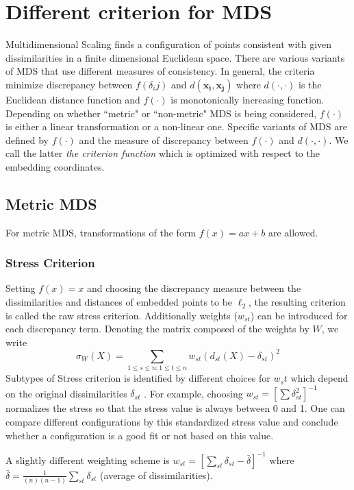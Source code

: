 \documentclass[12pt,oneside,final]{thesis}\usepackage[]{graphicx}\usepackage[]{color}
\begin{document}
\section{Different criterion for MDS \label{sec:MDSvariant}}
Multidimensional Scaling finds a configuration of points consistent with given dissimilarities in a finite dimensional Euclidean space. There are various variants of MDS that use different measures of consistency.  In general, the criteria minimize discrepancy between $f(\delta_ij)$ and  $d(\bm{x_i},\bm{x_j})$ where $d(\cdot,\cdot)$ is the Euclidean distance function and $f(\cdot)$ is monotonically increasing function. Depending on whether ``metric" or ``non-metric" MDS is being considered, $f(\cdot)$ is either a linear transformation or a non-linear one. Specific variants of MDS are defined by $f(\cdot)$ and the measure of discrepancy between  $f(\cdot)$ and $d(\cdot,\cdot)$. We call the latter \emph{the criterion function} which is optimized with respect to the embedding coordinates.


\subsection{Metric MDS}
 For metric MDS, transformations of the form  $f(x)=ax+b$ are allowed.
 \subsubsection{Stress Criterion}
 Setting $f(x)=x$ and choosing  the discrepancy measure between the dissimilarities and distances of embedded points to be $\ell_2$, the resulting criterion is called the raw stress criterion. Additionally weights ($w_{st}$) can be introduced for each discrepancy term. Denoting the matrix composed of the weights by $W$, we write
 \begin{equation}
\sigma_{W}(X)=\sum_{1\leq s\leq n;1\leq t\leq n} {w_{st}(d_{st}(X)-\delta_{st})^2  }\label{raw-stress}
\end{equation}
Subtypes of Stress criterion is identified by different choices for $w_st$ which depend on the original dissimilarities $\delta_{st}$ .
For example, choosing $w_{st}=\left[{\sum{\delta_{st}^2}}\right]^{-1}$ normalizes the stress so that the stress value is always between 0 and 1. One can compare different configurations by this standardized stress value and conclude whether a configuration is a good fit or not based on this value.

A slightly different weighting scheme is $w_{st}=\left[ \sum_{st}{\delta_{st}-\bar{\delta} } \right]^{-1}$ 
where $\bar{\delta}=\frac{1}{(n)(n-1)} \sum_{st}{\delta_{st}}$ (average of dissimilarities).
\end{document}
